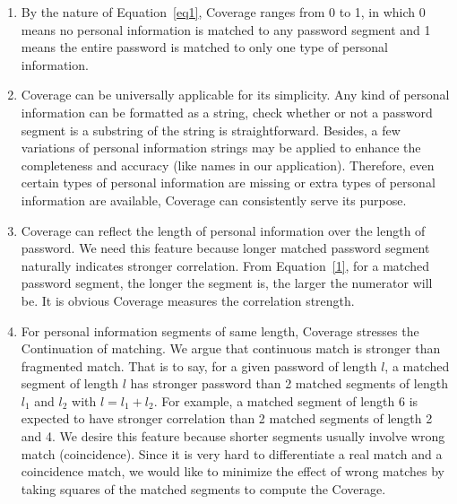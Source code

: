 \begin{enumerate}[leftmargin=*]
\item By the nature of Equation~\ref{eq1}, Coverage ranges from 0 to 1, in which 0 means no personal information is matched to any password segment and 1 means the entire password is matched to only one type of personal information. 
\item Coverage can be universally applicable for its simplicity. Any kind of personal information can be formatted as a string, check whether or not a password segment is a substring of the string is straightforward. Besides, a few variations of personal information strings may be applied to enhance the completeness and accuracy (like names in our application). Therefore, even certain types of personal information are missing or extra types of personal information are available, Coverage can consistently serve its purpose.
\item Coverage can reflect the length of personal information over the length of password. We need this feature because longer matched password segment naturally indicates stronger correlation. From Equation~\ref{1}, for a matched password segment, the longer the segment is, the larger the numerator will be. It is obvious Coverage measures the correlation strength. \item For personal information segments of same length, Coverage stresses the Continuation of matching. We argue that continuous match is stronger than fragmented match. That is to say, for a given password of length $l$, a matched segment of length $l$ has stronger password than 2 matched segments of length $l_1$ and $l_2$ with $l = l_1 + l_2$. For example, a matched segment of length 6 is expected to have stronger correlation than 2 matched segments of length 2 and 4. We desire this feature because shorter segments usually involve wrong match (coincidence). Since it is very hard to differentiate a real match and a coincidence match, we would like to minimize the effect of wrong matches by taking squares of the matched segments to compute the Coverage.
\end{enumerate}

